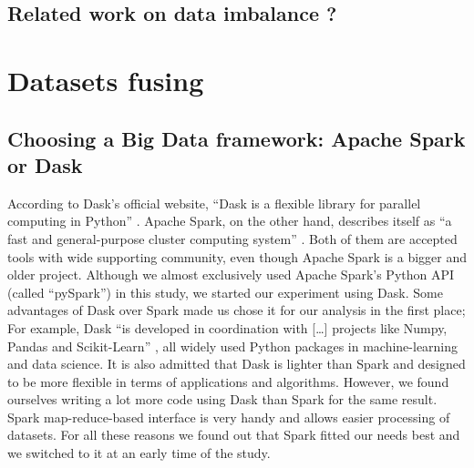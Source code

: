 \documentclass[conference]{IEEEtran}
\begin{document}
\subsection{Related work on data imbalance ?}

\section{Datasets fusing}
\subsection{Choosing a Big Data framework: Apache Spark or Dask}
According to Dask’s official website, “Dask is a flexible library for parallel computing in Python” \cite{dask}.
Apache Spark, on the other hand, describes itself as “a fast and general-purpose cluster computing system” \cite{spark}.
Both of them are accepted tools with wide supporting community, even though Apache Spark is a bigger and older project.
Although we almost exclusively used Apache Spark’s Python API (called “pySpark”) in this study, we started our experiment using Dask.
Some advantages of Dask over Spark made us chose it for our analysis in the first place; For example, Dask “is developed in coordination with […] projects like Numpy, Pandas and Scikit-Learn” \cite{dask}, all widely used Python packages in machine-learning and data science.
It is also admitted that Dask is lighter than Spark and designed to be more flexible in terms of applications and algorithms.
However, we found ourselves writing a lot more code using Dask than Spark for the same result.
Spark map-reduce-based interface is very handy and allows easier processing of datasets.
For all these reasons we found out that Spark fitted our needs best and we switched to it at an early time of the study.
\end{document}
